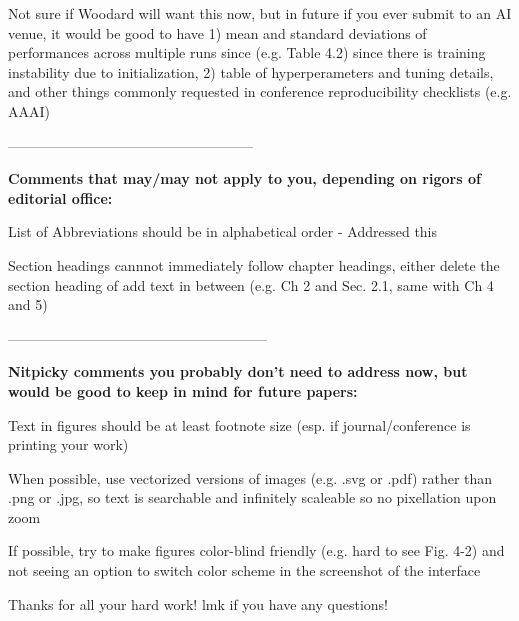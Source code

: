 Not sure if Woodard will want this now, but in future if you ever submit to an AI venue, it would be good to have 1) mean and standard deviations of performances across multiple runs since (e.g. Table 4.2) since there is training instability due to initialization, 2) table of hyperperameters and tuning details, and other things commonly requested in conference reproducibility checklists (e.g. AAAI)

-----------------------------------------------------

\textbf{Comments that may/may not apply to you, depending on rigors of editorial office:}

List of Abbreviations should be in alphabetical order
- Addressed this


Section headings cannnot immediately follow chapter headings, either delete the section heading of add text in between (e.g. Ch 2 and Sec. 2.1, same with Ch 4 and 5) 

--------------------------------------------------------

\textbf{Nitpicky comments you probably don’t need to address now, 
but would be good to keep in mind for future papers:
}

Text in figures should be at least footnote size (esp. if journal/conference is printing your work)

When possible, use vectorized versions of images (e.g. .svg or .pdf) rather than .png or .jpg, so text is searchable and infinitely scaleable so no pixellation upon zoom

If possible, try to make figures color-blind friendly (e.g. hard to see Fig. 4-2) and not seeing an option to switch color scheme in the screenshot of the interface


Thanks for all your hard work! lmk if you have any questions!